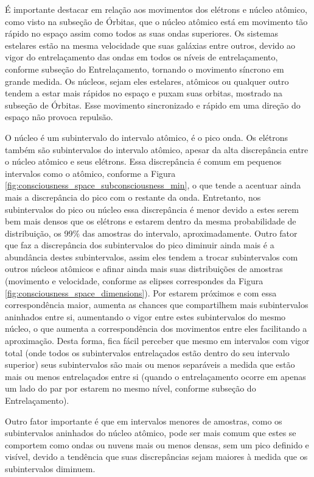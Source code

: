 É importante destacar em relação aos movimentos dos elétrons e núcleo atômico, como visto na subseção de Órbitas, que o núcleo atômico está em movimento tão rápido no espaço assim como todos as suas ondas superiores. Os sistemas estelares estão na mesma velocidade que suas galáxias entre outros, devido ao vigor do entrelaçamento das ondas em todos os níveis de entrelaçamento, conforme subseção do Entrelaçamento, tornando o movimento síncrono em grande medida. Os núcleos, sejam eles estelares, atômicos ou qualquer outro tendem a estar mais rápidos no espaço e puxam suas orbitas, mostrado na subseção de Órbitas. Esse movimento sincronizado e rápido em uma direção do espaço não provoca repulsão.

O núcleo é um subintervalo do intervalo atômico, é o pico onda. Os elétrons também são subintervalos do intervalo atômico, apesar da alta discrepância entre o núcleo atômico e seus elétrons. Essa discrepância é comum em pequenos intervalos como o atômico, conforme a Figura \ref{fig:consciousness_space_subconsciousness_min}, o que tende a acentuar ainda mais a discrepância do pico com o restante da onda. Entretanto, nos subintervalos do pico ou núcleo essa discrepância é menor devido a estes serem bem mais densos que os elétrons e estarem dentro da mesma probabilidade de distribuição, os 99\% das amostras do intervalo, aproximadamente. Outro fator que faz a discrepância dos subintervalos do pico diminuir ainda mais é a abundância destes subintervalos, assim eles tendem a trocar subintervalos com outros núcleos atômicos e afinar ainda mais suas distribuições de amostras (movimento e velocidade, conforme as elipses correspondes da Figura \ref{fig:consciousness_space_dimensions}). Por estarem próximos e com essa correspondência maior, aumenta as chances que compartilhem mais subintervalos aninhados entre si, aumentando o vigor entre estes subintervalos do mesmo núcleo, o que aumenta a correspondência dos movimentos entre eles facilitando a aproximação. Desta forma, fica fácil perceber que mesmo em intervalos com vigor total (onde todos os subintervalos entrelaçados estão dentro do seu intervalo superior) seus subintervalos são mais ou menos separáveis a medida que estão mais ou menos entrelaçados entre si (quando o entrelaçamento ocorre em apenas um lado do par por estarem no mesmo nível, conforme subseção do Entrelaçamento).

Outro fator importante é que em intervalos menores de amostras, como os subintervalos aninhados do núcleo atômico, pode ser mais comum que estes se comportem como ondas ou nuvens mais ou menos densas, sem um pico definido e visível, devido a tendência que suas discrepâncias sejam maiores à medida que os subintervalos diminuem.

